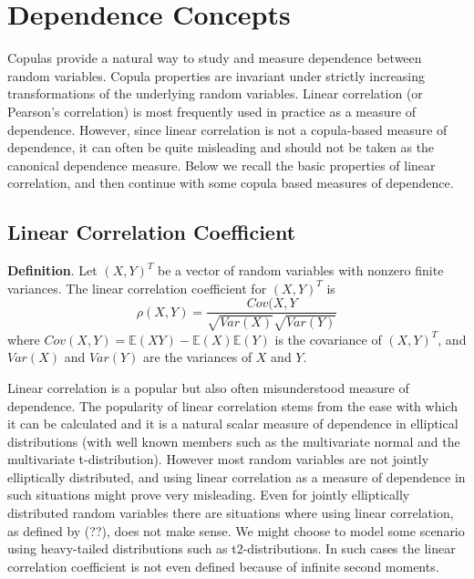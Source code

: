 \documentclass{article}
\begin{document}
\section{Dependence Concepts}

Copulas provide a natural way to study and measure dependence between random variables. Copula properties are invariant under strictly increasing transformations of the underlying random variables. Linear correlation (or Pearson’s correlation) is most frequently used in practice as a measure of dependence. However, since linear correlation is not a copula-based measure of dependence, it can often be quite misleading and should not be taken as the canonical dependence measure. Below we recall the basic properties of linear correlation, and then continue with some copula based measures of dependence.

\subsection{Linear Correlation Coefficient}

\noindent \textbf{Definition}. Let $(X,Y)^T$ be a vector of random variables with nonzero finite variances. The linear correlation coefficient for $(X,Y)^T$ is
\begin{equation}
	\rho(X,Y) = \frac{Cov(X,Y}{\sqrt{Var(X)}\sqrt{Var(Y)}}
\end{equation}	
where $Cov(X,Y) = \mathbb{E}(XY) -\mathbb{E}(X)\mathbb{E}(Y)$ is the covariance of $(X,Y)^T$, and $Var(X)$ and
$Var(Y)$ are the variances of $X$ and $Y$.


Linear correlation is a popular but also often misunderstood measure of dependence. The popularity of linear correlation stems from the ease with which it can be calculated and it is a natural scalar measure of dependence in elliptical distributions (with well known members such as the multivariate normal and the multivariate t-distribution). However most random variables are not jointly elliptically distributed, and using linear correlation as a measure of dependence in such situations might prove very misleading. Even for jointly elliptically distributed random variables there are situations where using linear correlation, as defined by (??), does not make sense. We might choose to model some scenario using heavy-tailed distributions such as t2-distributions. In such cases the linear correlation coefficient is not even defined because of infinite second moments.
\end{document}
